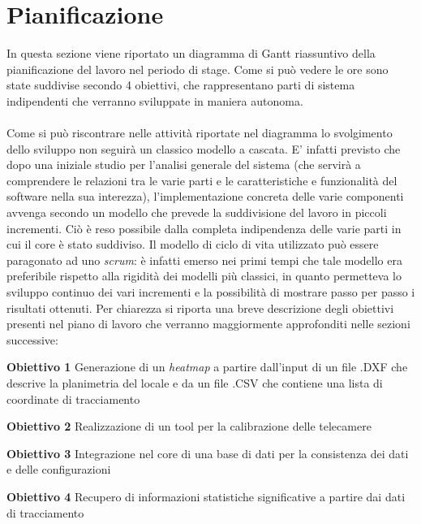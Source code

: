 \section{Pianificazione} \label{sec:pianificazione}
In questa sezione viene riportato un diagramma di Gantt riassuntivo della pianificazione del lavoro nel periodo di stage. Come si può vedere le ore sono state suddivise secondo 4 obiettivi, che rappresentano parti di sistema indipendenti che verranno sviluppate in maniera autonoma. \\ \\
Come si può riscontrare nelle attività riportate nel diagramma lo svolgimento dello sviluppo non seguirà un classico modello a cascata. E' infatti previsto che dopo una iniziale studio per l'analisi generale del sistema (che servirà a comprendere le relazioni tra le varie parti e le caratteristiche e funzionalità del software nella sua interezza), l'implementazione concreta delle varie componenti avvenga secondo un modello che prevede la suddivisione del lavoro in piccoli incrementi. Ciò è reso possibile dalla completa indipendenza delle varie parti in cui il core è stato suddiviso. Il modello di ciclo di vita utilizzato può essere paragonato ad uno \textit{scrum}: è infatti emerso nei primi tempi che tale modello era preferibile rispetto alla rigidità dei modelli più classici, in quanto permetteva lo sviluppo continuo dei vari incrementi e la possibilità di mostrare passo per passo i risultati ottenuti. Per chiarezza si riporta una breve descrizione degli obiettivi presenti nel piano di lavoro che verranno maggiormente approfonditi nelle sezioni successive:
\begin{description}
	\item \textbf{Obiettivo 1} Generazione di un \textit{heatmap} a partire dall'input di un file .DXF che descrive la planimetria del locale e da un file .CSV che contiene una lista di coordinate di tracciamento
	\item \textbf{Obiettivo 2} Realizzazione di un tool per la calibrazione delle telecamere
	\item \textbf{Obiettivo 3} Integrazione nel core di una base di dati per la consistenza dei dati e delle configurazioni
	\item \textbf{Obiettivo 4} Recupero di informazioni statistiche significative a partire dai dati di tracciamento
	
\end{description}


